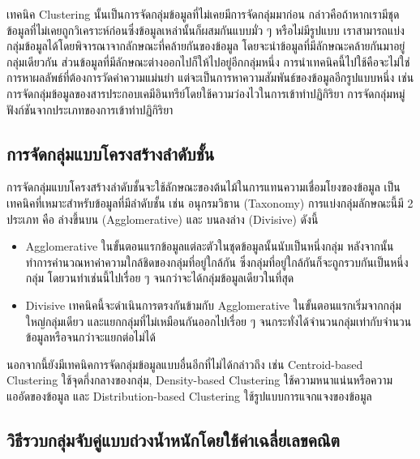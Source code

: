 เทคนิค Clustering นั้นเป็นการจัดกลุ่มข้อมูลที่ไม่เคยมีการจัดกลุ่มมาก่อน กล่าวคือถ้าหากเรามีชุดข้อมูลที่ไม่เคยถูกวิเคราะห์ก่อนซึ่งข้อมูลเหล่านั้นก็ผสมกันแบบมั่ว ๆ หรือไม่มีรูปแบบ เราสามารถแบ่งกลุ่มข้อมูลได้โดยพิจารณาจากลักษณะที่คล้ายกันของข้อมูล โดยจะนำข้อมูลที่มีลักษณะคล้ายกันมาอยู่กลุ่มเดียวกัน ส่วนข้อมูลที่มีลักษณะต่างออกไปก็ให้ไปอยู่อีกกลุ่มหนึ่ง การนำเทคนิคนี้ไปใช้คือจะไม่ใช่การหาผลลัพธ์ที่ต้องการวัดค่าความแม่นยำ แต่จะเป็นการหาความสัมพันธ์ของข้อมูลอีกรูปแบบหนึ่ง เช่น การจัดกลุ่มข้อมูลของสารประกอบเคมีอินทรีย์โดยใช้ความว่องไวในการเข้าทำปฏิกิริยา การจัดกลุ่มหมู่ฟังก์ชันจากประเภทของการเข้าทำปฏิกิริยา

\subsection{การจัดกลุ่มแบบโครงสร้างลำดับชั้น}
\label{ssec:hierar_clustering}

การจัดกลุ่มแบบโครงสร้างลำดับชั้นจะใช้ลักษณะของต้นไม้ในการแทนความเชื่อมโยงของข้อมูล เป็นเทคนิคที่เหมาะสำหรับข้อมูลที่มีลำดับชั้น เช่น อนุกรมวิธาน (Taxonomy) การแบ่งกลุ่มลักษณะนี้มี 2 ประเภท คือ ล่างขึ้นบน (Agglomerative) และ บนลงล่าง (Divisive) ดังนี้
%
\begin{itemize}[topsep=0pt,noitemsep]\setlength\itemsep{0.5em}
    \item Agglomerative ในขั้นตอนแรกข้อมูลแต่ละตัวในชุดข้อมูลนั้นนับเป็นหนึ่งกลุ่ม หลังจากนั้นทำการคำนวณหาค่าความใกล้ชิดของกลุ่มที่อยู่ใกล้กัน ซึ่งกลุ่มที่อยู่ใกล้กันก็จะถูกรวบกันเป็นหนึ่งกลุ่ม โดยวนทำเช่นนี้ไปเรื่อย ๆ จนกว่าจะได้กลุ่มข้อมูลเดียวในที่สุด

    \item Divisive เทคนิคนี้จะดำเนินการตรงกันข้ามกับ Agglomerative ในขั้นตอนแรกเริ่มจากกลุ่มใหญ่กลุ่มเดียว และแยกกลุ่มที่ไม่เหมือนกันออกไปเรื่อย ๆ จนกระทั่งได้จำนวนกลุ่มเท่ากับจำนวนข้อมูลหรือจนกว่าจะแยกต่อไม่ได้
\end{itemize}

นอกจากนี้ยังมีเทคนิคการจัดกลุ่มข้อมูลแบบอื่นอีกที่ไม่ได้กล่าวถึง เช่น Centroid-based Clustering ใช้จุดกึ่งกลางของกลุ่ม, Density-based Clustering ใช้ความหนาแน่นหรือความแออัดของข้อมูล และ Distribution-based Clustering ใช้รูปแบบการแจกแจงของข้อมูล

\subsection{วิธีรวบกลุ่มจับคู่แบบถ่วงน้ำหนักโดยใช้ค่าเฉลี่ยเลขคณิต}
\label{ssec:wpgma}

